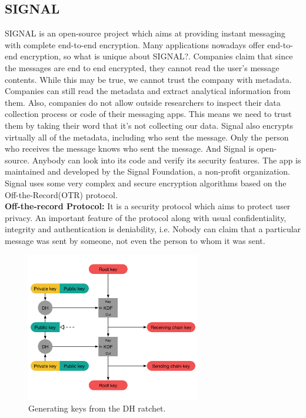 \documentclass[12pt, conference, a4paper]{article}
\begin{document}
\subsection{SIGNAL}
SIGNAL is an open-source project which aims at providing instant messaging with complete end-to-end encryption. Many applications nowadays offer end-to-end encryption, so what is unique about SIGNAL?. Companies claim that since the messages are end to end encrypted, they cannot read the user's message contents. While this may be true, we cannot trust the company with metadata.  Companies can still read the metadata and extract analytical information from them. Also, companies do not allow outside researchers to inspect their data collection process or code of their messaging apps. This means we need to trust them by taking their word that it's not collecting our data. Signal also encrypts virtually all of the metadata, including who sent the message. Only the person who receives the message knows who sent the message. And Signal is open-source. Anybody can look into its code and verify its security features. The app is maintained and developed by the Signal Foundation, a non-profit organization. Signal uses some very complex and secure encryption algorithms based on the Off-the-Record(OTR) protocol.\\
\textbf{Off-the-record Protocol:} It is a security protocol which aims to protect user privacy. An important feature of the protocol along with usual confidentiality, integrity and authentication is deniability, i.e. Nobody can claim that a particular message was sent by someone, not even the person to whom it was sent. 
\begin{figure}[H]
\begin{center}
  \includegraphics[width=3in]{double_ratchet.png}
  \caption{Generating keys from the DH ratchet.\cite{signalDoc}}
\end{center}
\end{figure}
\end{document}
